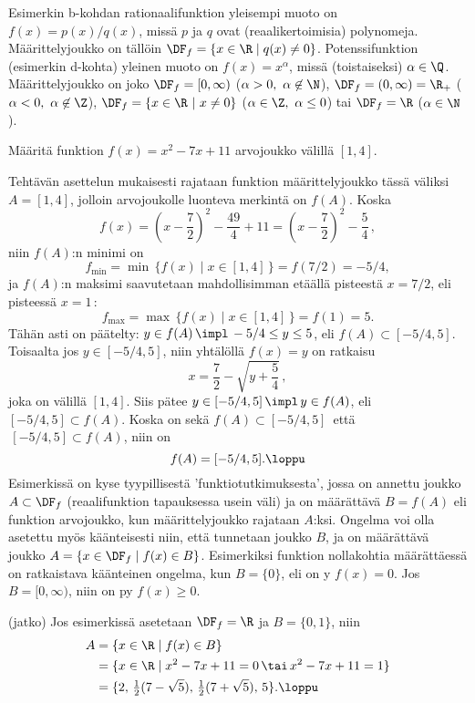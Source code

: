 Esimerkin b-kohdan rationaalifunktion yleisempi muoto on $f(x)=p(x)/q(x)$, missä $p$ ja $q$
ovat (reaalikertoimisia) polynomeja. Määrittelyjoukko on tällöin
$\DF_f=\{x\in\R \mid q(x) \neq 0\}$. Potenssifunktion (esimerkin d-kohta) yleinen muoto on
$f(x)=x^\alpha$, missä (toistaiseksi) $\alpha\in\Q$. Määrittelyjoukko on joko
$\DF_f=[0,\infty)$ ($\alpha>0,\ \alpha\not\in\N$), 
$\DF_f=(0,\infty)=\R_+$ ($\alpha<0,\ \alpha\not\in\Z$),
$\DF_f=\{x\in\R\ |\ x \neq 0\}$ ($\alpha\in\Z,\ \alpha \le 0$) tai
$\DF_f=\R$ ($\alpha\in\N$). 
\begin{Exa} \label{erään polynomin arvojoukko} Määritä funktion $f(x) = x^2-7x+11$ arvojoukko
välillä $[1,4]$. \end{Exa}
\ratk Tehtävän asettelun mukaisesti rajataan funktion määrittelyjoukko tässä väliksi
$A = [1,4]$, jolloin arvojoukolle luonteva merkintä on $f(A)$. Koska
\[ 
f(x) = \left(x - \dfrac{7}{2}\right)^2 - \dfrac{49}{4} + 11 
                                       = \left(x - \dfrac{7}{2}\right)^2 - \dfrac{5}{4}\,, 
\]
niin $f(A)$:n minimi on
\[ 
f_{\text{min}} = \min\,\{f(x) \mid x \in [1,4]\,\} = f(7/2) = -5/4, 
\]
ja $f(A)$:n maksimi saavutetaan mahdollisimman etäällä pisteestä $x = 7/2$, eli pisteessä 
$x=1$\,:
\[ 
f_{\text{max}} = \max\,\{f(x) \mid x \in [1,4]\,\} = f(1) = 5. 
\]
Tähän asti on päätelty: $y \in f(A)\,\impl\,-5/4 \le y \le 5$, eli $f(A) \subset [-5/4,5]$. 
Toisaalta jos $y \in [-5/4,5]$, niin yhtälöllä $f(x)=y$ on ratkaisu
\[
x = \dfrac{7}{2} - \sqrt{y + \dfrac{5}{4}}\,,
\]
joka on välillä $[1,4]$. Siis pätee $y \in [-5/4,5]\,\impl\,y \in f(A)$, eli 
$[-5/4,5] \subset f(A)$. Koska on sekä $f(A) \subset [-5/4,5]\,$ että 
$\,[-5/4,5] \subset f(A)$, niin on 
\[
f(A) = [-5/4,5]. \loppu 
\]
Esimerkissä on kyse tyypillisestä 'funktiotutkimuksesta', jossa on annettu joukko
$A \subset \DF_f$ (reaalifunktion tapauksessa usein väli) ja on määrättävä $B=f(A)$ eli
funktion arvojoukko, kun määrittelyjoukko rajataan $A$:ksi. Ongelma voi olla asetettu myös
käänteisesti niin, että tunnetaan joukko $B$, ja on määrättävä joukko 
$A = \{x \in \DF_f \mid f(x) \in B\}$. Esimerkiksi funktion nollakohtia määrättäessä on 
ratkaistava käänteinen ongelma, kun $B=\{0\}$, eli on  y 
$f(x)=0$. Jos $B=[0,\infty)$, niin on  py
$f(x) \ge 0$. 
\jatko \begin{Exa} (jatko) Jos esimerkissä asetetaan $\DF_f=\R$ ja $B=\{0,1\}$, niin
\begin{align*}
A &= \{x\in\R \mid f(x) \in B\} \\
  &= \{x\in\R \mid x^2-7x+11=0\,\tai\,x^2-7x+11=1\} \\
  &= \{2,\,\tfrac{1}{2}(7-\sqrt{5}),\,\tfrac{1}{2}(7+\sqrt{5}),\,5\}. \loppu
\end{align*}
\end{Exa}

